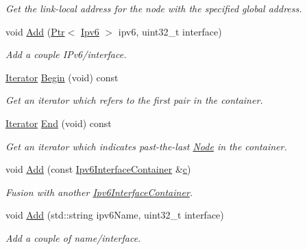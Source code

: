 \begin{DoxyCompactItemize}
\begin{DoxyCompactList}\small\item\em Get the link-\/local address for the node with the specified global address. \end{DoxyCompactList}\item 
void \hyperlink{classns3_1_1Ipv6InterfaceContainer_ad9df7e1d407117aac8be4cea4deebb9b}{Add} (\hyperlink{classns3_1_1Ptr}{Ptr}$<$ \hyperlink{classns3_1_1Ipv6}{Ipv6} $>$ ipv6, uint32\+\_\+t interface)
\begin{DoxyCompactList}\small\item\em Add a couple I\+Pv6/interface. \end{DoxyCompactList}\item 
\hyperlink{classns3_1_1Ipv6InterfaceContainer_ad0dd912971eb260ce6a22cab34e809c0}{Iterator} \hyperlink{classns3_1_1Ipv6InterfaceContainer_a7cf8975399dfdb4cfb6df73a9209b882}{Begin} (void) const 
\begin{DoxyCompactList}\small\item\em Get an iterator which refers to the first pair in the container. \end{DoxyCompactList}\item 
\hyperlink{classns3_1_1Ipv6InterfaceContainer_ad0dd912971eb260ce6a22cab34e809c0}{Iterator} \hyperlink{classns3_1_1Ipv6InterfaceContainer_af11b0ab74357a5edb40cee18aa7ed378}{End} (void) const 
\begin{DoxyCompactList}\small\item\em Get an iterator which indicates past-\/the-\/last \hyperlink{classns3_1_1Node}{Node} in the container. \end{DoxyCompactList}\item 
void \hyperlink{classns3_1_1Ipv6InterfaceContainer_a37305e7fb93869481d538f8f23392d33}{Add} (const \hyperlink{classns3_1_1Ipv6InterfaceContainer}{Ipv6\+Interface\+Container} \&\hyperlink{mmwave_2model_2fading-traces_2fading__trace__generator_8m_ae0323a9039add2978bf5b49550572c7c}{c})
\begin{DoxyCompactList}\small\item\em Fusion with another \hyperlink{classns3_1_1Ipv6InterfaceContainer}{Ipv6\+Interface\+Container}. \end{DoxyCompactList}\item 
void \hyperlink{classns3_1_1Ipv6InterfaceContainer_a6338f403aaf73f51d30833374883f5ca}{Add} (std\+::string ipv6\+Name, uint32\+\_\+t interface)
\begin{DoxyCompactList}\small\item\em Add a couple of name/interface. \end{DoxyCompactList}\item 

\end{DoxyCompactItemize}
